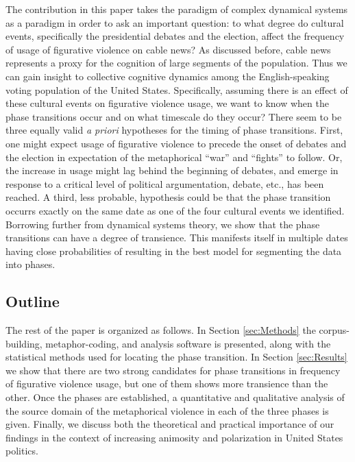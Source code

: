 The contribution in this paper takes the paradigm of complex dynamical systems
as a paradigm in order to ask an important question: to what degree do cultural
events, specifically the presidential debates and the election, affect the
frequency of usage of figurative violence on cable news? As discussed before,
cable news represents a proxy for the cognition of large segments of the
population. Thus we can gain insight to collective cognitive dynamics among
the English-speaking voting population of the United States. Specifically,
assuming there is an effect of these cultural events on figurative violence usage,
we want to know when the phase transitions occur and on what timescale do they
occur? There seem to be three equally valid \textit{a priori} hypotheses for
the timing of phase transitions. First, one might expect usage of figurative
violence to precede the onset of debates and the election in expectation of the
metaphorical ``war'' and ``fights'' to follow. Or, the increase in usage
might lag behind the beginning of debates, and emerge in response to a 
critical level of political argumentation, debate, etc., has been reached.
A third, less probable, hypothesis could be that the phase transition occurrs
exactly on the same date as one of the four cultural events we identified.
Borrowing further from dynamical systems theory, we show that the phase
transitions can have a degree of transience. This manifests itself in multiple
dates having close probabilities of resulting in the best model for segmenting
the data into phases.

\subsection{Outline}
\label{sub:Outline}

The rest of the paper is organized as follows. In Section \ref{sec:Methods}
the corpus-building, metaphor-coding, and analysis software is presented,
along with the statistical methods used for locating the phase transition.
In Section \ref{sec:Results} we show that there are two strong candidates
for phase transitions in frequency of figurative violence usage, but one of
them shows more transience than the other. Once the phases are established,
a quantitative and qualitative analysis of the source domain of the metaphorical
violence in each of the three phases is given. Finally, we discuss both the
theoretical and practical importance of our findings in the context of
increasing animosity and polarization in United States politics.

